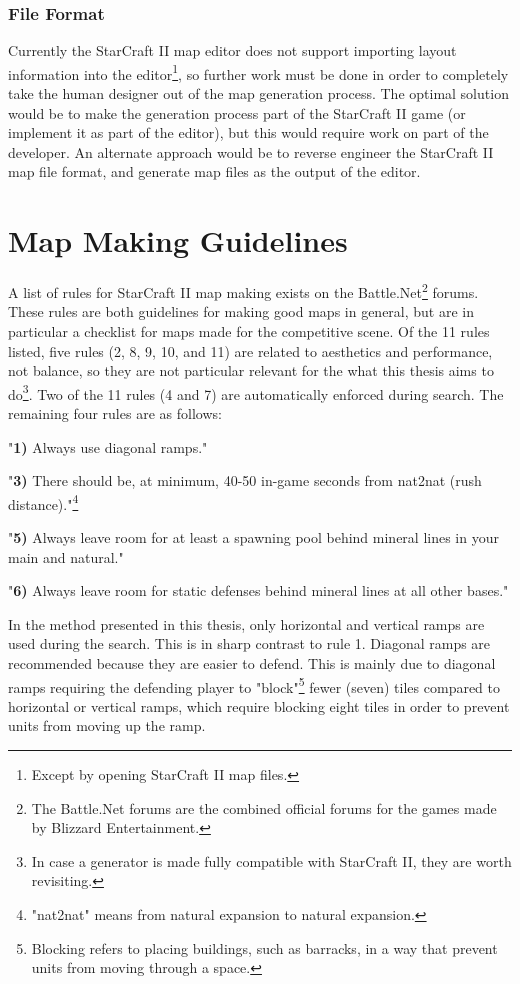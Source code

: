 \subsubsection{File Format}
Currently the StarCraft II map editor does not support importing layout information into the editor\footnote{Except by opening StarCraft II map files.}, so further work must be done in order to completely take the human designer out of the map generation process. The optimal solution would be to make the generation process part of the StarCraft II game (or implement it as part of the editor), but this would require work on part of the developer. An alternate approach would be to reverse engineer the StarCraft II map file format, and generate map files as the output of the editor.

\section{Map Making Guidelines}
\label{futurework_guidelines}
A list of rules for StarCraft II map making exists on the Battle.Net\footnote{The Battle.Net forums are the combined official forums for the games made by Blizzard Entertainment.} forums\cite{blizzardrulesmapmaking}. These rules are both guidelines for making good maps in general, but are in particular a checklist for maps made for the competitive scene. Of the 11 rules listed, five rules (2, 8, 9, 10, and 11) are related to aesthetics and performance, not balance, so they are not particular relevant for the what this thesis aims to do\footnote{In case a generator is made fully compatible with StarCraft II, they are worth revisiting.}. Two of the 11 rules (4 and 7) are automatically enforced during search. The remaining four rules are as follows:

\begin{my_itemize}
\item "\textbf{1)} Always use diagonal ramps."
\item "\textbf{3)} There should be, at minimum, 40-50 in-game seconds from nat2nat (rush distance)."\footnote{"nat2nat" means from natural expansion to natural expansion.}
\item "\textbf{5)} Always leave room for at least a spawning pool behind mineral lines in your main and natural."
\item "\textbf{6)} Always leave room for static defenses behind mineral lines at all other bases."
\end{my_itemize}

In the method presented in this thesis, only horizontal and vertical ramps are used during the search. This is in sharp contrast to rule 1. Diagonal ramps are recommended because they are easier to defend. This is mainly due to diagonal ramps requiring the defending player to "block"\footnote{Blocking refers to placing buildings, such as barracks, in a way that prevent units from moving through a space.} fewer (seven) tiles compared to horizontal or vertical ramps, which require blocking eight tiles in order to prevent units from moving up the ramp.

